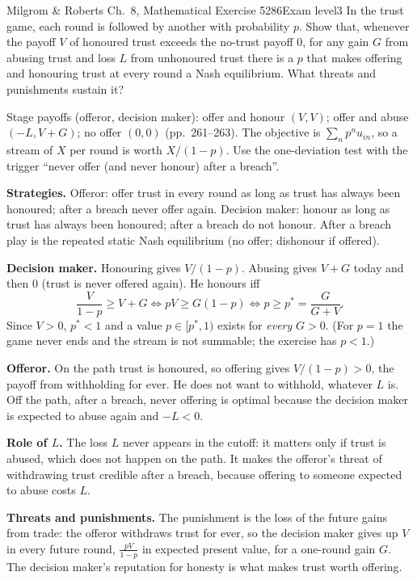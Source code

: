 \begin{exsol}{Milgrom \& Roberts Ch.~8, Mathematical Exercise 5}{286}{Exam level}{3}
\asked In the trust game, each round is followed by another with probability $p$. Show that, whenever the
payoff $V$ of honoured trust exceeds the no-trust payoff $0$, for any gain $G$ from abusing trust and loss $L$
from unhonoured trust there is a $p$ that makes offering and honouring trust at every round a Nash equilibrium.
What threats and punishments sustain it?

\method Stage payoffs (offeror, decision maker): offer and honour $(V, V)$; offer and abuse $(-L, V + G)$; no offer
$(0, 0)$ (pp.~261--263). The objective is $\sum_n p^n u_{in}$, so a stream of $X$ per round is worth
$X/(1-p)$. Use the one-deviation test with the trigger ``never offer (and never honour) after a breach''.

\solution
\textbf{Strategies.} Offeror: offer trust in every round as long as trust has always been honoured; after a
breach never offer again. Decision maker: honour as long as trust has always been honoured; after a breach do not
honour. After a breach play is the repeated static Nash equilibrium (no offer; dishonour if offered).

\textbf{Decision maker.} Honouring gives $V/(1-p)$. Abusing gives $V + G$ today and then $0$ (trust is never offered
again). He honours iff
\[
  \frac{V}{1-p} \ge V + G \iff pV \ge G(1-p) \iff p \ge p^* = \frac{G}{G + V}.
\]
Since $V > 0$, $p^* < 1$ and a value $p \in [p^*, 1)$ exists for \emph{every} $G > 0$. (For $p = 1$ the game
never ends and the stream is not summable; the exercise has $p < 1$.)

\textbf{Offeror.} On the path trust is honoured, so offering gives $V/(1-p) > 0$, the payoff from withholding for
ever. He does not want to withhold, whatever $L$ is. Off the path, after a breach, never offering is optimal
because the decision maker is expected to abuse again and $-L < 0$.

\textbf{Role of $L$.} The loss $L$ never appears in the cutoff: it matters only if trust is abused, which does not
happen on the path. It makes the offeror's threat of withdrawing trust credible after a breach, because
offering to someone expected to abuse costs $L$.

\textbf{Threats and punishments.} The punishment is the loss of the future gains from trade: the offeror withdraws
trust for ever, so the decision maker gives up $V$ in every future round, $\frac{pV}{1-p}$ in expected present value,
for a one-round gain $G$. The decision maker's reputation for honesty is what makes trust worth offering.


\end{exsol}

